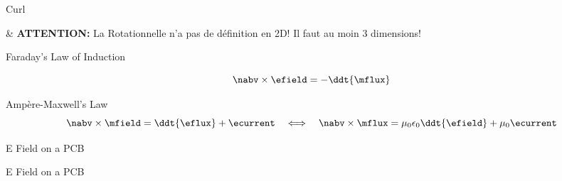 \begin{frame}{Curl}
    \begin{makelist}[\small][1.5]
        \icon[red]{\faExclamationTriangle} & \textbf{ATTENTION:} La Rotationnelle n'a pas de définition en 2D! Il faut au moin 3 dimensions!
    \end{makelist}
\end{frame}

\begin{frame}{Faraday's Law of Induction}
    \begin{twocolumns}[0.35]
    \leftcol
        \vspace{-10pt}
        \begin{equation}
            \nabv \times \efield = -\ddt{\mflux}
        \end{equation}
    \rightcol
 \end{twocolumns}

\end{frame}

\begin{frame}{Ampère-Maxwell's Law}
    \vspace{-10pt}
    \begin{equation}
        \nabv \times \mfield = \ddt{\eflux} + \ecurrent
        \hspace{1em} \Longleftrightarrow \hspace{1.0em}
        \nabv \times \mflux = \mu_0 \epsilon_0 \ddt{\efield} + \mu_0 \ecurrent
    \end{equation}
\end{frame}

\begin{frame}{E Field on a PCB}
    \vspace{-20pt}
\end{frame}

\begin{frame}{E Field on a PCB}
    \vspace{-20pt}
\end{frame}

